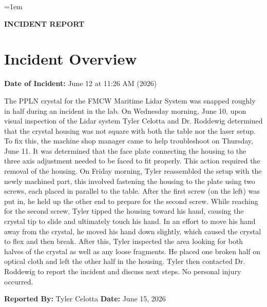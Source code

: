 \documentclass[12pt]{article} \usepackage[utf8]{inputenc} \usepackage[margin=1in]{geometry}
\begin{document}
\sloppy
\emergencystretch=1em

\begin{center} {\Large \textbf{INCIDENT REPORT}} \end{center} \vspace{0.5cm}

\section*{Incident Overview}

\noindent\textbf{Date of Incident:} June 12 at 11:26 AM (2026)
\vspace{0.5cm}

\noindent The PPLN crystal for the FMCW Maritime Lidar System was snapped roughly in half during an incident in the lab.
On Wednesday morning, June 10, upon visual inspection of the Lidar system Tyler Celotta and Dr. Roddewig determined
that the crystal housing was not square with both the table nor the laser setup. To fix this, the machine shop manager
came to help troubleshoot on Thursday, June 11. It was determined that the face plate connecting the housing to the
three axis adjustment needed to be faced to fit properly. This action required the removal of the housing.
On Friday morning, Tyler reassembled the setup with the newly machined part, this involved fastening the housing
to the plate using two screws, each placed in parallel to the table. After the first screw (on the left) was put in,
he held up the other end to prepare for the second screw. While reaching for the second screw, Tyler tipped the housing
toward his hand, causing the crystal tip to slide and ultimately touch his hand. In an effort to move his hand away
from the crystal, he moved his hand down slightly, which caused the crystal to flex and then break. After this,
Tyler inspected the area looking for both halves of the crystal as well as any loose fragments. He placed one broken
half on optical cloth and left the other half in the housing. Tyler then contacted Dr. Roddewig to report the incident
and discuss next steps. No personal injury occurred.

\vspace{0.5cm}
\noindent \textbf{Reported By:} Tyler Celotta \hfill \textbf{Date:} June 15, 2026
\end{document}
